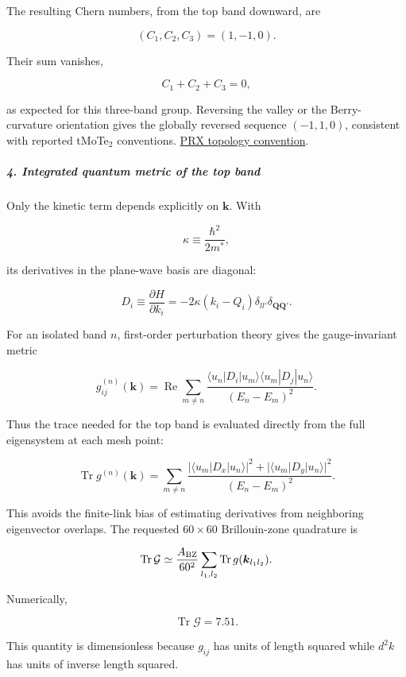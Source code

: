 The resulting Chern numbers, from the top band downward, are

\[
(C_1,C_2,C_3)=(1,-1,0).
\]

Their sum vanishes,

\[
C_1+C_2+C_3=0,
\]

as expected for this three-band group. Reversing the valley or the Berry-curvature orientation gives the globally reversed sequence $(-1, 1, 0)$, consistent with reported tMoTe$_2$ conventions. \href{\detokenize{https://journals.aps.org/prx/pdf/10.1103/PhysRevX.13.031037}}{PRX topology convention}.

\subparagraph*{4. Integrated quantum metric of the top band}

Only the kinetic term depends explicitly on $\boldsymbol k$. With

\[
\kappa\equiv\frac{\hbar^2}{2m^*},
\]

its derivatives in the plane-wave basis are diagonal:

\[
D_i\equiv\frac{\partial H}{\partial k_i}
=-2\kappa(k_i-Q_i)\delta_{ll'}\delta_{\boldsymbol Q\boldsymbol Q'}.
\]

For an isolated band $n$, first-order perturbation theory gives the gauge-invariant metric

\[
g_{ij}^{(n)}(\boldsymbol k)
=\operatorname{Re}\sum_{m\ne n}
\frac{\langle u_n|D_i|u_m\rangle\langle u_m|D_j|u_n\rangle}
{(E_n-E_m)^2}.
\]

Thus the trace needed for the top band is evaluated directly from the full eigensystem at each mesh point:

\[
\operatorname{Tr}g^{(n)}(\boldsymbol k)
=\sum_{m\ne n}
\frac{|\langle u_m|D_x|u_n\rangle|^2+|\langle u_m|D_y|u_n\rangle|^2}
{(E_n-E_m)^2}.
\]

This avoids the finite-link bias of estimating derivatives from neighboring eigenvector overlaps. The requested $60\times60$ Brillouin-zone quadrature is

\[
\operatorname{Tr}\mathcal G
\simeq \frac{A_{\rm BZ}}{60^2}
\sum_{l_1,l_2}\operatorname{Tr}g(\boldsymbol k_{l_1l_2}).
\]

Numerically,

\[
\operatorname{Tr}\mathcal G=7.51.
\]

This quantity is dimensionless because $g_{ij}$ has units of length squared while $d^2k$ has units of inverse length squared.
